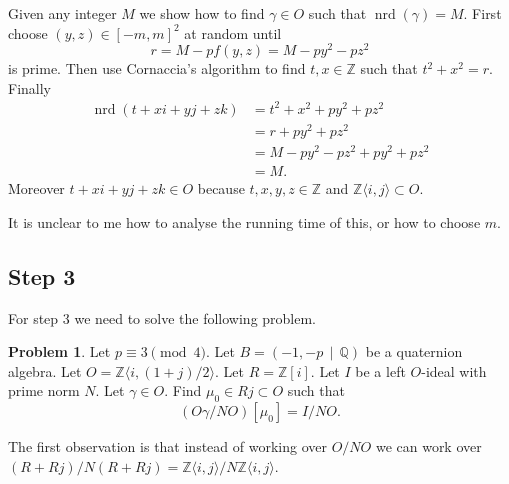 \documentclass[10pt]{article}
\theoremstyle{plain}
\theoremstyle{definition}
\newtheorem{prob}[theorem]{Problem}
\newcommand{\op}{\operatorname}
\newcommand{\Z}{\mathbb{Z}}
\newcommand{\Q}{\mathbb{Q}}
\newcommand{\nrd}{\op{nrd}}
\begin{document}
Given any integer \( M \) we show how to find \( \gamma \in O \) such that \( \nrd(\gamma) = M \). First choose \( (y, z) \in [-m , m]^2 \) at random until
\[
    r = M - pf(y, z) = M - py^2 - pz^2
\]
is prime.
Then use Cornaccia's algorithm to find \( t, x \in \Z \) such that \(  t^2 + x^2 = r.\)
Finally
\begin{align*}
    \nrd(t + xi + yj + zk)
      & = t^2 + x^2 + py^2 + pz^2       \\
      & = r + py^2 + pz^2               \\
      & = M - py^2 - pz^2 + py^2 + pz^2 \\
      & = M.
\end{align*}
Moreover \( t + xi + yj + zk \in O \) because \( t, x, y, z \in \Z \) and \( \Z \langle i ,j\rangle \subset O \).

{\color{red} It is unclear to me how to analyse the running time of this, or how to choose \( m \).}

\subsection{Step 3}
For step 3 we need to solve the following problem.

\begin{prob} \label{prob: gamma*mu_0 = alpha}
    Let \( p \equiv 3 \pmod{4} \).
    Let \( B =  (-1, -p \, \mid \, \Q) \) be a quaternion algebra.
    Let \( O = \Z \langle i, (1+j) / 2 \rangle \).
    Let \( R = \Z[i] \).
    Let \( I \) be a left \( O \)-ideal with prime norm \( N \).
    Let \( \gamma \in O \).
    Find \( \mu_0 \in Rj \subset  O \) such that
    \[
        (O\gamma / NO)[\mu_0] = I / NO.
    \]
\end{prob}

The first observation is that instead of working over \( O / NO \) we can work over \( (R+Rj) / N(R+Rj) = \Z \langle i, j \rangle / N \Z \langle i, j \rangle\).
\end{document}
